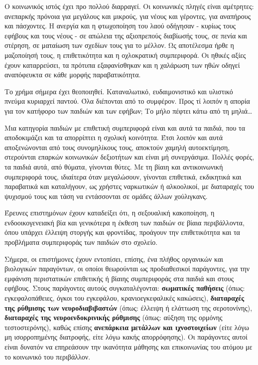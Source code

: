 \documentclass[12pt,a4paper,oneside]{book}
\begin{document}
\indent Ο κοινωνικός ιστός έχει προ πολλού διαρραγεί. Οι κοινωνικές πληγές είναι
αμέτρητες: ανεπαρκής πρόνοια  για μεγάλους και μικρούς, για νέους και γέροντες, για αναπήρους και πάσχοντες. Η ανεργία και η φτωχοποίηση του λαού οδήγησαν - κυρίως τους εφήβους και τους
νέους - σε απώλεια της αξιοπρεπούς διαβίωσής τους, σε πενία και στέρηση, σε
ματαίωση των σχεδίων τους για το μέλλον. Ως αποτέλεσμα ήρθε η μαζοποίησή τους, η
επιθετικότητα και η οχλοκρατική συμπεριφορά. Οι ηθικές αξίες έχουν καταρρεύσει,
τα πρότυπα εξαφανίσθηκαν και η χαλάρωση των ηθών οδηγεί αναπόφευκτα σε κάθε
μορφής παραβατικότητα.

\indent Το χρήμα σήμερα έχει θεοποιηθεί.
Καταναλωτικό, ευδαιμονιστικό και υλιστικό πνεύμα κυριαρχεί παντού. Όλα
διέπονται από το συμφέρον. Προς τί λοιπόν η απορία για τον κατήφορο των παιδιών
και των εφήβων; Το μήλο πέφτει κάτω από τη μηλιά\ldots

\indent Μια κατηγορία παιδιών με
επιθετική συμπεριφορά είναι και αυτά τα παιδιά, που τα αποδοκιμάζει και τα απορρίπτει η
σχολική κοινότητα. Έτσι λοιπόν και αυτά αποξενώνονται από τους συνομηλίκους
τους, αποκτούν χαμηλή αυτοεκτίμηση, στερούνται επαρκών κοινωνικών δεξιοτήτων και
είναι μή συνεργάσιμα. Πολλές φορές, τα παιδιά αυτά, από θύματα, γίνονται θύτες.
Με τη βίαιη και αντικοινωνική συμπεριφορά τους, ιδιαίτερα όταν μεγαλώσουν,
γίνονται επιθετικά, εκδικητικά και παραβατικά και καταλήγουν, ως χρήστες
ναρκωτικών ή αλκοολικοί, με διαταραχές του ψυχισμού τους και τάση να
εντάσσονται σε ομάδες άλλων χούλιγκανς.

\indent Έρευνες επιστημόνων έχουν καταδείξει ότι, η σεξουαλική κακοποίηση, η
ενδοοικογενειακή βία και γενικότερα η έκθεση των παιδιών σε βίαια περιβάλλοντα, όπου υπάρχει έλλειψη στοργής και φροντίδας,
προάγουν την επιθετικότητα και τα προβλήματα συμπεριφοράς των παιδιών στο
σχολείο.

\indent Σήμερα, οι επιστήμονες έχουν
εντοπίσει, επίσης, ένα πλήθος οργανικών και βιολογικών παραγόντων, οι οποίοι
θεωρούνται ως προδιαθεσικοί παράγοντες, για την εμφάνιση περιστατικών επιθετικής
ή βίαιης συμπεριφοράς στα παιδιά και στους εφήβους. Στους παράγοντες αυτούς
συγκαταλέγονται: \textbf{σωματικές παθήσεις} (όπως: εγκεφαλοπάθειες, όγκοι του
εγκεφάλου, κρανιοεγκεφαλικές κακώσεις), \textbf{διαταραχές της ρύθμισης των
νευροδιαβιβαστών} (όπως: έλλειψη ή ελάττωση της σεροτονίνης), \textbf{διαταραχές
της νευροενδοκρινικής ρύθμισης} (όπως: αύξηση της ορμόνης τεστοστερόνης), καθώς
επίσης \textbf{ανεπάρκεια μετάλλων και ιχνοστοιχείων} (είτε λόγω μη
ισορροπημένης διατροφής, είτε λόγω κακής απορρόφησης). Οι παράγοντες αυτοί είναι δυνατόν να επηρεάσουν την
ικανότητα μάθησης και επικοινωνίας του ατόμου με το κοινωνικό του περιβάλλον.
\end{document}
